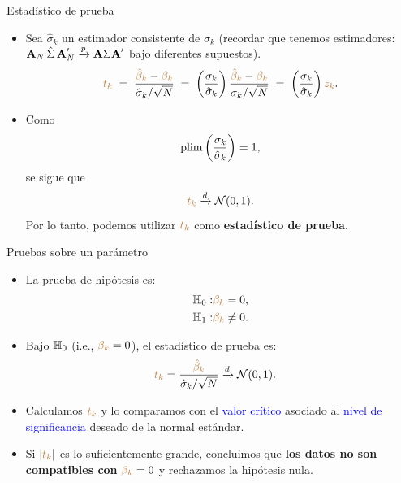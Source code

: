 \documentclass[10pt, xcolor=dvipsnames]{beamer}
\begin{document}
\begin{frame}{Estadístico de prueba}
\begin{itemize}
    \item Sea $\hat{\sigma}_k$ un estimador consistente de $\sigma_k$ (recordar que tenemos estimadores: \(\textbf{A}_N \, \hat{\Sigma} \, \textbf{A}'_N \xrightarrow{p} \textbf{A} \Sigma \textbf{A}'\) bajo diferentes supuestos).
    \[
        \textcolor{brown}{t_k} \;=\; \frac{\textcolor{brown}{\hat{\beta}_k} - \textcolor{brown}{\beta_k}}{\hat{\sigma}_k / \sqrt{N}}
        \;=\; \left(\frac{\sigma_k}{\hat{\sigma}_k}\right)
              \frac{\textcolor{brown}{\hat{\beta}_k} - \textcolor{brown}{\beta_k}}{\sigma_k / \sqrt{N}}
        \;=\; \left(\frac{\sigma_k}{\hat{\sigma}_k}\right) \textcolor{brown}{z_k}.
    \]
    \item Como 
    \[
        \plim \left(\frac{\sigma_k}{\hat{\sigma}_k}\right) = 1,
    \]
    se sigue que
    \[
        \textcolor{brown}{t_k} \xrightarrow{d} \mathcal{N}(0,1).
    \]
    Por lo tanto, podemos utilizar $\textcolor{brown}{t_k}$ como \textbf{estadístico de prueba}.
\end{itemize}
\end{frame}


\begin{frame}{Pruebas sobre un parámetro}
\begin{itemize}
    \item La prueba de hipótesis es:
    \begin{align*}
    \begin{split}
        \textcolor{black}{\mathbb{H}_{0}}:& \textcolor{brown}{\beta_k} = 0, \\
        \textcolor{black}{\mathbb{H}_{1}}:& \textcolor{brown}{\beta_k} \neq 0.
    \end{split}
    \end{align*}
        \item Bajo $\textcolor{black}{\mathbb{H}_{0}}$ (i.e., \(\textcolor{brown}{\beta_k} = 0\)), el estadístico de prueba es: 
    \begin{align*}
    \begin{split}
        \textcolor{brown}{t_k} &= \frac{\textcolor{brown}{\hat{\beta}_k}}{\hat{\sigma}_k/\sqrt{N}} \xrightarrow{d} \mathcal{N}(0,1).
    \end{split}
    \end{align*}
\vspace{-1em}
    \item Calculamos $\textcolor{brown}{t_k}$ y lo comparamos con el \textcolor{blue}{valor crítico} asociado al \textcolor{blue}{nivel de significancia} deseado de la normal estándar.
    \item Si $|\textcolor{brown}{t_k}|$ es lo suficientemente grande, concluimos que \textbf{los datos no son compatibles con} $\textcolor{brown}{\beta_k} = 0$ y rechazamos la hipótesis nula. 
\end{itemize}
\end{frame}
\end{document}
